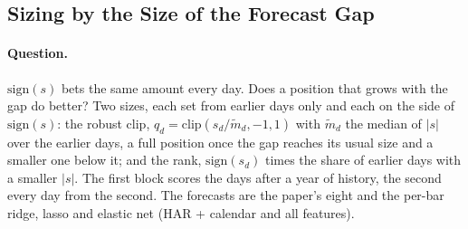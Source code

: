 \subsection{Sizing by the Size of the Forecast Gap}
\label{sec:app_run_sizing}

\paragraph{Question.} $\mathrm{sign}(s)$ bets the same amount every day. Does
a position that grows with the gap do better? Two sizes, each set from earlier
days only and each on the side of $\mathrm{sign}(s)$: the robust clip,
$q_d=\mathrm{clip}(s_d/\tilde m_d,-1,1)$ with $\tilde m_d$ the median of $|s|$
over the earlier days, a full position once the gap reaches its usual size and
a smaller one below it; and the rank, $\mathrm{sign}(s_d)$ times the share of
earlier days with a smaller $|s|$. The first block scores the days after a year
of history, the second every day from the second. The forecasts are the
paper's eight and the per-bar ridge, lasso and elastic net (HAR + calendar and
all features).

\begin{table}[H]
\centering
\caption{Sized rules against $\mathrm{sign}(s)$ on the same days. The ridge
columns give the block-diagonal ridge's mean absolute position, its sized
Sharpe ratio and the difference from $\mathrm{sign}(s)$. The count columns
report, over the \runappSzForecasts{} forecasts, how many differences are
positive, and their median.}
\label{tab:app_run_sizing}
\runappfit{\small}
\end{table}

